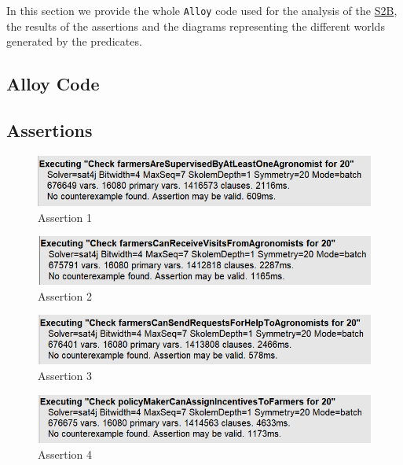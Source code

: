 In this section we provide the whole \texttt{Alloy} code used for the analysis of the \hyperref[tab:acronymsTable]{S2B}, the results of the assertions and the diagrams representing the different worlds generated by the predicates.

\subsection{Alloy Code}
\label{sec:alloy_code}

\newpage


\subsection{Assertions}

\begin{figure}[H]
    \centering
    \includegraphics[]{Images/Alloy/assertion - farmersAreSupervisedByAtLeastOneAgronomist.png}
    \caption{Assertion 1}
    \label{fig:assertion1}
\end{figure}

\begin{figure}[H]
    \centering
    \includegraphics[]{Images/Alloy/assertion - farmersCanReceiveVisitsFromAgronomists.png}
    \caption{Assertion 2}
    \label{fig:assertion2}
\end{figure}

\begin{figure}[H]
    \centering
    \includegraphics[]{Images/Alloy/assertion - farmersCanSendRequestsForHelpToAgronomists.png}
    \caption{Assertion 3}
    \label{fig:assertion3}
\end{figure}

\begin{figure}[H]
    \centering
    \includegraphics[]{Images/Alloy/assertion - policyMakerCanAssignIncentivesToFarmers.png}
    \caption{Assertion 4}
    \label{fig:assertion4}
\end{figure}

